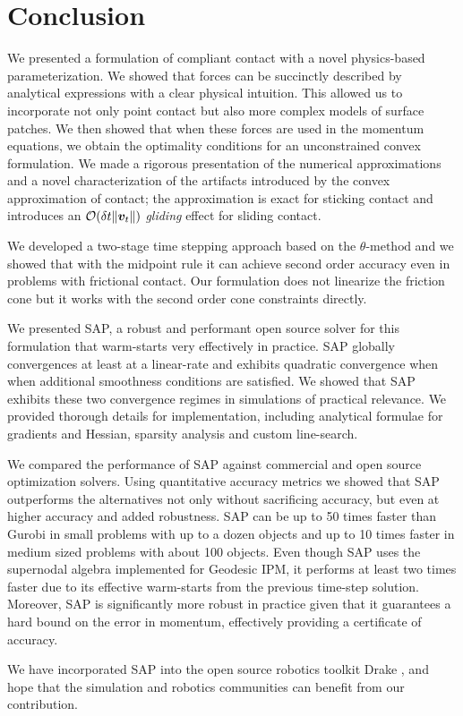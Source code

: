 \section{Conclusion}
\label{sec:future_directions}

We presented a formulation of compliant contact with a novel physics-based
parameterization. We showed that forces can be succinctly described by analytical
expressions with a clear physical intuition. This allowed us to incorporate not
only point contact but also more complex models of surface patches. We then showed
that when these forces are used in the momentum equations, we obtain the
optimality conditions for an unconstrained convex formulation. We made a
rigorous presentation of the numerical approximations and a novel
characterization of the artifacts introduced by the convex approximation of
contact; the approximation is exact for sticking contact and introduces an
$\mathcal{O}(\delta t\|{\bm{v}}_t\|)$ \emph{gliding} effect for sliding contact.

We developed a two-stage time stepping approach based on the
$\theta\text{-method}$ and we showed that with the midpoint rule it can achieve
second order accuracy even in problems with frictional contact. Our formulation
does not linearize the friction cone but it works with the second order cone
constraints directly.

We presented SAP, a robust and performant open source solver for this formulation that
warm-starts very effectively in practice. SAP 
globally convergences at least at a linear-rate and exhibits quadratic convergence when when additional smoothness conditions are satisfied. We showed that SAP
exhibits these two convergence regimes in simulations of practical relevance. We
provided thorough details for implementation, including analytical
formulae for gradients and Hessian, sparsity analysis and custom line-search.

We compared the performance of SAP against commercial and open source
optimization solvers. Using quantitative accuracy metrics we showed that SAP
outperforms the alternatives not only without sacrificing accuracy, but even at
higher accuracy and added robustness. SAP can be up to 50 times faster than
Gurobi in small problems with up to a dozen objects and up to 10 times faster in
medium sized problems with about 100 objects. Even though SAP uses the
supernodal algebra implemented for Geodesic IPM, it performs at least two times
faster due to its effective warm-starts from the previous time-step
solution. Moreover, SAP is significantly more robust in practice given
that it guarantees a hard bound on the error in momentum, effectively providing
a certificate of accuracy.

We have incorporated SAP into the open source robotics toolkit Drake
\cite{bib:drake}, and hope that the simulation and robotics communities can
benefit from our contribution.
